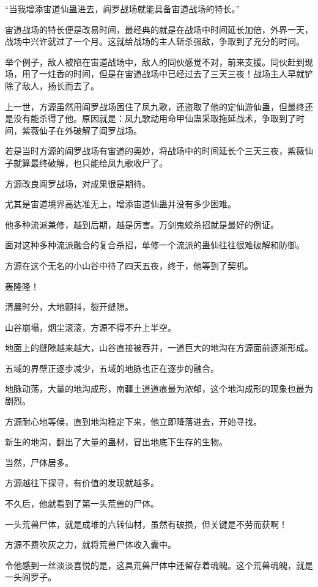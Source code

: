 \begin{this_body}
“当我增添宙道仙蛊进去，阎罗战场就能具备宙道战场的特长。”

宙道战场的特长便是改易时间，最经典的就是在战场中时间延长加倍，外界一天，战场中兴许就过了一个月。这就给战场的主人斩杀强敌，争取到了充分的时间。

举个例子，敌人被陷在宙道战场中，敌人的同伙感觉不对，前来支援。同伙赶到现场，用了一炷香的时间，但是在宙道战场中已经过去了三天三夜！战场主人早就铲除了敌人，扬长而去了。

上一世，方源虽然用阎罗战场困住了凤九歌，还盗取了他的定仙游仙蛊，但最终还是没有能杀得了他。原因就是：凤九歌动用命甲仙蛊采取拖延战术，争取到了时间，紫薇仙子在外破解了阎罗战场。

若是当时方源的阎罗战场有宙道的奥妙，将战场中的时间延长个三天三夜，紫薇仙子就算最终破解，也只能给凤九歌收尸了。

方源改良阎罗战场，对成果很是期待。

尤其是宙道境界高达准无上，增添宙道仙蛊并没有多少困难。

他多种流派兼修，越到后期，越是厉害。万剑鬼蛟杀招就是最好的例证。

面对这种多种流派融合的复合杀招，单修一个流派的蛊仙往往很难破解和防御。

方源在这个无名的小山谷中待了四天五夜，终于，他等到了契机。

轰隆隆！

清晨时分，大地颤抖，裂开缝隙。

山谷崩塌，烟尘滚滚，方源不得不升上半空。

地面上的缝隙越来越大，山谷直接被吞并，一道巨大的地沟在方源面前逐渐形成。

五域的界壁正逐步减少，五域的地脉也正在逐步的融合。

地脉动荡，大量的地沟成形，南疆土道道痕最为浓郁，这个地沟成形的现象也最为剧烈。

方源耐心地等候，直到地沟稳定下来，他立即降落进去，开始寻找。

新生的地沟，翻出了大量的蛊材，冒出地底下生存的生物。

当然，尸体居多。

方源越往下探寻，有价值的发现就越多。

不久后，他就看到了第一头荒兽的尸体。

一头荒兽尸体，就是成堆的六转仙材，虽然有破损，但关键是不劳而获啊！

方源不费吹灰之力，就将荒兽尸体收入囊中。

令他感到一丝淡淡喜悦的是，这具荒兽尸体中还留存着魂魄。这个荒兽魂魄，就是一头阎罗子。


\end{this_body}
